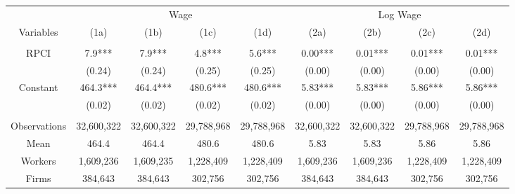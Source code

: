\begin{tabular}{c|cccc|cccc}
\toprule
\toprule
      & \multicolumn{4}{c|}{Wage}     & \multicolumn{4}{c}{Log Wage} \\
Variables & (1a)  & (1b)  & (1c)  & (1d)  & (2a)  & (2b)  & (2c)  & (2d) \\
\midrule
      &       &       &       &       &       &       &       &  \\
RPCI  & 7.9*** & 7.9*** & 4.8*** & 5.6*** & 0.00*** & 0.01*** & 0.01*** & 0.01*** \\
      & (0.24) & (0.24) & (0.25) & (0.25) & (0.00) & (0.00) & (0.00) & (0.00) \\
Constant & 464.3*** & 464.4*** & 480.6*** & 480.6*** & 5.83*** & 5.83*** & 5.86*** & 5.86*** \\
      & (0.02) & (0.02) & (0.02) & (0.02) & (0.00) & (0.00) & (0.00) & (0.00) \\
      &       &       &       &       &       &       &       &  \\
\midrule
Observations & 32,600,322 & 32,600,322 & 29,788,968 & 29,788,968 & 32,600,322 & 32,600,322 & 29,788,968 & 29,788,968 \\
Mean  & 464.4 & 464.4 & 480.6 & 480.6 & 5.83  & 5.83  & 5.86  & 5.86 \\
Workers & 1,609,236 & 1,609,235 & 1,228,409 & 1,228,409 & 1,609,236 & 1,609,236 & 1,228,409 & 1,228,409 \\
Firms & 384,643 & 384,643 & 302,756 & 302,756 & 384,643 & 384,643 & 302,756 & 302,756 \\
\bottomrule
\bottomrule
\end{tabular}%
